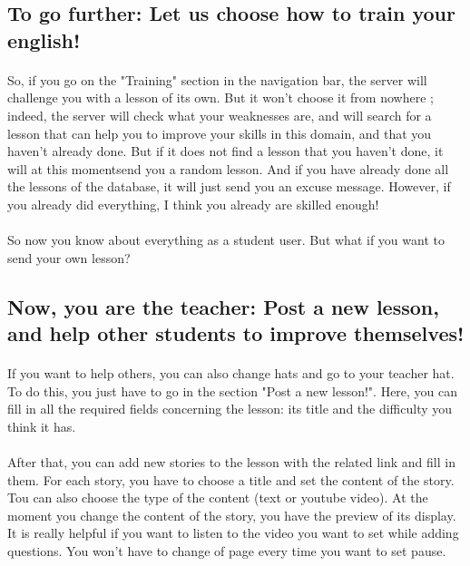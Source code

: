 \subsection{To go further: Let us choose how to train your english!}

\paragraph{}
So, if you go on the "Training" section in the navigation bar, the server will challenge you with a lesson of its own. But it won't choose it from nowhere ; indeed, the server will check what your weaknesses are, and will search for a lesson that can help you to improve your skills in this domain, and that you haven't already done.\linebreak
But if it does not find a lesson that you haven't done, it will at this momentsend you a random lesson. And if you have already done all the lessons of the database, it will just send you an excuse message. However, if you already did everything, I think you already are skilled enough!

\paragraph{}
So now you know about everything as a student user. But what if you want to send your own lesson?

\subsection{Now, you are the teacher: Post a new lesson, and help other students to improve themselves!}

\paragraph{}
If you want to help others, you can also change hats and go to your teacher hat. To do this, you just have to go in the section "Post a new lesson!". Here, you can fill in all the required fields concerning the lesson: its title and the difficulty you think it has. 

\paragraph{}
After that, you can add new stories to the lesson with the related link and fill in them. For each story, you have to choose a title and set the content of the story. Tou can also choose the type of the content (text or youtube video). At the moment you change the content of the story, you have the preview of its display. It is really helpful if you want to listen to the video you want to set while adding questions. You won't have to change of page every time you want to set pause. 

